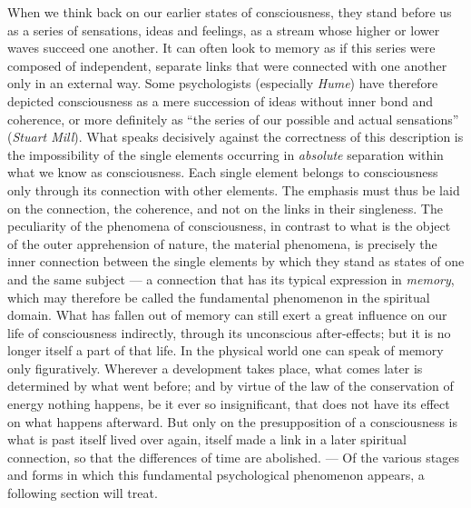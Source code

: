 \documentclass[12pt,a4paper]{book}
\newcommand{\opage}[1]{\marginnote{\footnotesize\textit{[#1]}}}
\begin{document}
When we think back on our earlier states of consciousness, they stand
before us as a series of sensations, ideas and feelings, as a stream
whose higher or lower waves succeed one another. It can often look to
memory as if this series were composed of independent, separate links
that were connected with one another only in an external way. Some
psychologists (especially \emph{Hume}) have therefore depicted
consciousness as a mere succession of ideas without inner bond and
coherence, or more definitely as ``the series of our possible and
actual sensations'' (\emph{Stuart Mill}). What speaks decisively against
the correctness of this description is the impossibility of the single
elements occurring in \emph{absolute} separation within what we know as
consciousness. Each single element belongs to consciousness only through
its connection with other elements. The emphasis must thus be laid on
the connection, the coherence, and not on the links in their
singleness. The peculiarity of the phenomena of consciousness, in
\opage{58}contrast to what is the object of the outer apprehension of
nature, the material phenomena, is precisely the inner connection
between the single elements by which they stand as states of one and the
same subject --- a connection that has its typical expression in
\emph{memory}, which may therefore be called the fundamental phenomenon
in the spiritual domain. What has fallen out of memory can still exert
a great influence on our life of consciousness indirectly, through its
unconscious after-effects; but it is no longer itself a part of that
life. In the physical world one can speak of memory only figuratively.
Wherever a development takes place, what comes later is determined by
what went before; and by virtue of the law of the conservation of
energy nothing happens, be it ever so insignificant, that does not have
its effect on what happens afterward. But only on the presupposition of
a consciousness is what is past itself lived over again, itself made a
link in a later spiritual connection, so that the differences of time
are abolished. --- Of the various stages and forms in which this
fundamental psychological phenomenon appears, a following section will
treat.
\end{document}
